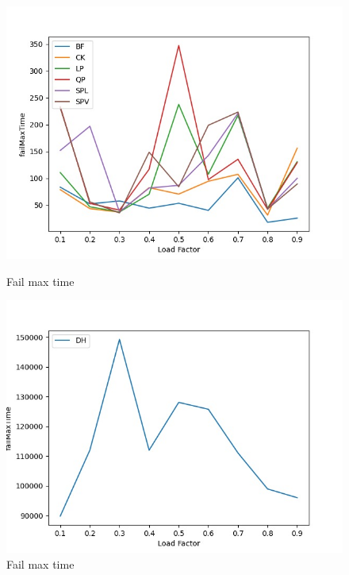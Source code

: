 \documentclass{article}
\begin{document}
    \begin{figure}[!h]
          \includegraphics[width=\linewidth]{images/loadFactor_vs_failMaxTime.jpeg}
          \caption{Fail max time}\label{fig:plot2}
        \endminipage\hfill
          \includegraphics[width=\linewidth]{images/loadFactor_vs_failMaxTimeDH.jpeg}
          \caption{Fail max time}\label{fig:plot3}
        \endminipage
        \end{figure}
        
\end{document}

